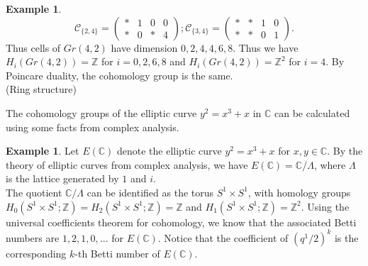 \documentclass[psamsfonts]{amsart}
\theoremstyle{definition}
\newtheorem{exmp}[theorem]{Example}
\theoremstyle{remark}
\numberwithin{equation}{section}
\begin{document}
\begin{exmp}
\begin{equation}
			\mathcal{C}_{\{ 2,4\}} = 						\begin{pmatrix}
				*&1&0&0 \\ *&0&*&4
			\end{pmatrix};
			\mathcal{C}_{\{ 3,4\}} = 						\begin{pmatrix}
				*&*&1&0 \\ *&*&0&1
			\end{pmatrix}.
			\end{equation}	
			Thus cells of $Gr(4,2)$ have dimension $0,2,4,4,6,8$. Thus we have $H_i(Gr(4,2)) = \mathbb{Z}$ for $i=0,2,6,8$ and $H_i(Gr(4,2)) = \mathbb{Z}^2$ for $i=4$. By Poincare duality, the cohomology group is the same.\\
			\indent (Ring structure)					 
		\end{exmp}
			The cohomology groups of the elliptic curve $y^2 = x^3 + x$ in $\mathbb{C}$ can be calculated using some facts from complex analysis.
		\begin{exmp}
			Let $E(\mathbb{C})$ denote the elliptic curve $y^2 = x^3 + x$ for $x,y \in \mathbb{C}$. By the theory of elliptic curves from complex analysis, we have $E(\mathbb{C}) = \mathbb{C} / \Lambda$, where $\Lambda$ is the lattice generated by $1$ and $i$.\\
			\indent The quotient $\mathbb{C} / \Lambda$ can be identified as the torus $S^1 \times S^1$, with homology groups $H_0(S^1 \times S^1; \mathbb{Z}) = H_2(S^1 \times S^1; \mathbb{Z}) = \mathbb{Z}$ and $H_1(S^1 \times S^1; \mathbb{Z}) = \mathbb{Z}^2$. Using the universal coefficients theorem for cohomology, we know that the associated Betti numbers are $1,2,1,0,...$ for $E(\mathbb{C})$. Notice that the coefficient of $(q^1/2)^k$ is the corresponding $k$-th Betti number of $E(\mathbb{C})$.
		\end{exmp}
		
\end{document}
